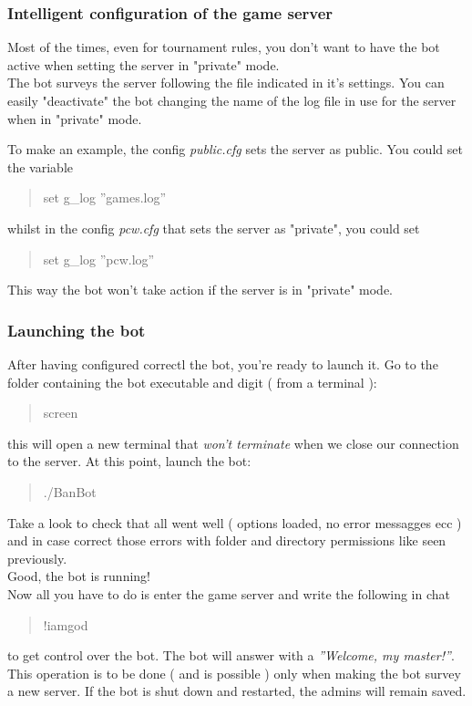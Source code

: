 \documentclass[a4paper]{article}
\begin{document}
\subsubsection{Intelligent configuration of the game server}
Most of the times, even for tournament rules, you don't want to have the bot active when setting the server in "private" mode.\\
The bot surveys the server following the file indicated in it's settings. You can easily "deactivate" the bot changing the name of the log file
in use for the server when in "private" mode.

To make an example, the config \textit{public.cfg} sets the server as public. You could set the variable
\begin{quote}
set g\_log ''games.log''
\end{quote}
whilst in the config \textit{pcw.cfg} that sets the server as "private", you could set
\begin{quote}
set g\_log ''pcw.log''
\end{quote}

This way the bot won't take action if the server is in "private" mode.

\subsubsection{Launching the bot}
After having configured correctl the bot, you're ready to launch it.
Go to the folder containing the bot executable and digit ( from a terminal ):
\begin{quote}
screen
\end{quote}
this will open a new terminal that \textit{won't terminate} when we close our connection to the server.
At this point, launch the bot:
\begin{quote}
./BanBot
\end{quote}
Take a look to check that all went well ( options loaded, no error messagges ecc ) and in case correct those errors with folder and
directory permissions like seen previously.\\

Good, the bot is running!\\

Now all you have to do is enter the game server and write the following in chat
\begin{quote}
!iamgod
\end{quote}
to get control over the bot. The bot will answer with a \textit{''Welcome, my master!''}. This operation is to be done ( and is possible )
only when making the bot survey a new server. If the bot is shut down and restarted, the admins will remain saved.\\
\end{document}
